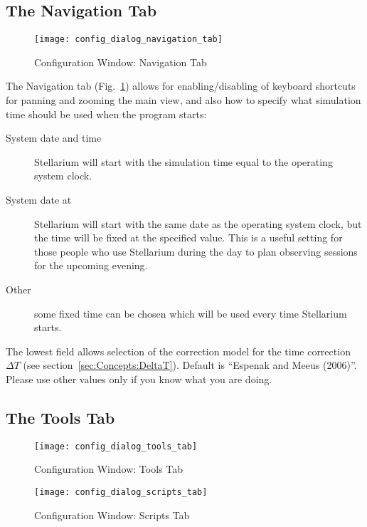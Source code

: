 \subsection{The Navigation Tab}
\label{sec:gui:configuration:nav}


\begin{figure}[p]
\centering\texttt{[image: config\_dialog\_navigation\_tab]}
\caption{Configuration Window: Navigation Tab}
\label{fig:gui:configuration:nav}
\end{figure}

The Navigation tab (Fig.~\ref{fig:gui:configuration:nav}) allows for
enabling/disabling of keyboard shortcuts for panning and zooming the
main view, and also how to specify what simulation time should be used
when the program starts:

\begin{description}
\item[System date and time] Stellarium will start with
  the simulation time equal to the operating system clock.
\item[System date at] Stellarium will start with the
  same date as the operating system clock, but the time will be fixed at
  the specified value. This is a useful setting for those people who use
  Stellarium during the day to plan observing sessions for the upcoming
  evening.
\item[Other] some fixed time can be chosen which will
  be used every time Stellarium starts.
\end{description}

The lowest field allows selection of the correction model for the time
correction $\Delta T$ (see section~\ref{sec:Concepts:DeltaT}). Default
is ``Espenak and Meeus (2006)''. Please use other values only if you
know what you are doing.

\subsection{The Tools Tab}
\label{sec:gui:configuration:tools}


\begin{figure}[p]
\centering\texttt{[image: config\_dialog\_tools\_tab]}
\caption{Configuration Window: Tools Tab}
\label{fig:gui:configuration:tools}
\end{figure}

\begin{figure}[p]
\centering\texttt{[image: config\_dialog\_scripts\_tab]}
\caption{Configuration Window: Scripts Tab}
\label{fig:gui:configuration:scripts}
\end{figure}

